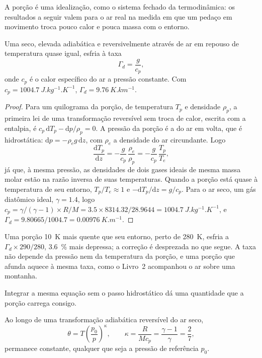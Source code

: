 A porção é uma idealização, como o sistema fechado da termodinâmica: os resultados a seguir valem
para o ar real na medida em que um pedaço em movimento troca pouco calor e pouca massa com o
entorno.

\begin{theorem}\label{thm:b1:fluid-envelopes-structure:dry-adiabatic}
Uma  seco, elevada adiabática e reversivelmente através de ar em repouso de
temperatura quase igual, esfria à taxa
\[
  \Gamma_d = \frac{g}{c_p},
\]
onde $c_p$ é o calor específico do ar a pressão constante. Com $c_p =
\qty{1004.7}{J.kg^{-1}.K^{-1}}$, $\Gamma_d = \qty{9.76}{K.km^{-1}}$.
\end{theorem}

\begin{proof}
Para um quilograma da porção, de temperatura $T_p$ e densidade $\rho_p$, a primeira lei de uma
transformação reversível sem troca de calor, escrita com a entalpia, é $c_p\,\mathrm dT_p - \mathrm dp/\rho_p = 0$. A pressão da porção é a do ar em volta, que é hidrostática: $\mathrm dp = -\rho_e
g\,\mathrm dz$, com $\rho_e$ a densidade do ar circundante. Logo
\[
  \frac{\mathrm dT_p}{\mathrm dz} = -\frac{g}{c_p}\,\frac{\rho_e}{\rho_p}
  = -\frac{g}{c_p}\,\frac{T_p}{T_e},
\]
já que, à mesma pressão, as densidades de dois gases ideais de mesma massa molar estão na razão
inversa de suas temperaturas. Quando a porção está quase à temperatura de seu entorno,
$T_p/T_e \approx 1$ e $-\mathrm dT_p/\mathrm dz
= g/c_p$. Para o ar seco, um gás diatômico ideal, $\gamma = 1.4$, logo $c_p =
\gamma/(\gamma - 1) \times R/M = 3.5 \times 8314.32/28.9644 =
\qty{1004.7}{J.kg^{-1}.K^{-1}}$, e $\Gamma_d = 9.80665/1004.7 =
\qty{0.00976}{K.m^{-1}}$.
\end{proof}

Uma porção \qty{10}{K} mais quente que seu entorno, perto de \qty{280}{K}, esfria a
$\Gamma_d \times 290/280$, \qty{3.6}{\percent} mais depressa; a correção é desprezada no que
segue. A taxa não depende da pressão nem da temperatura da porção, e uma porção que afunda aquece
à mesma taxa, como o Livro~2 acompanhou o ar sobre uma montanha.

Integrar a mesma equação sem o passo hidrostático dá uma quantidade que a porção carrega consigo.

\begin{proposition}\label{prop:b1:fluid-envelopes-structure:theta}
Ao longo de uma transformação adiabática reversível do ar seco,
\[
  \theta = T\left(\frac{p_0}{p}\right)^{\kappa},\qquad \kappa = \frac{R}{Mc_p} =
  \frac{\gamma - 1}{\gamma} = \frac{2}{7},
\]
permanece constante, qualquer que seja a pressão de referência $p_0$.
\end{proposition}

